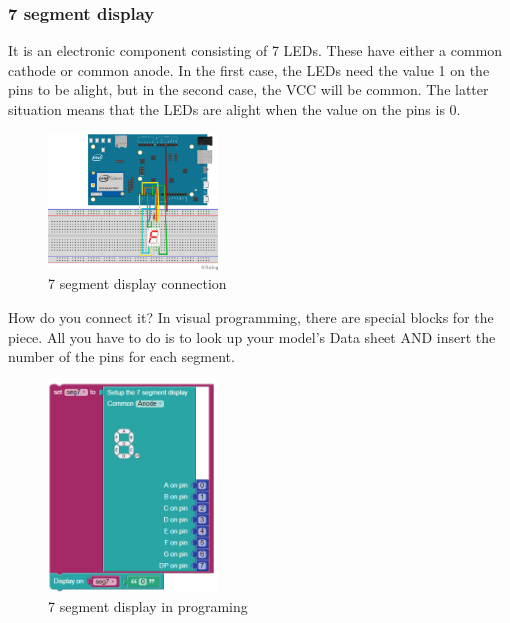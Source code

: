 \subsubsection{7 segment display}
It is an electronic component consisting of 7 LEDs. These have either a common cathode or common anode. In the first case, the LEDs need the value 1 on the pins to be alight, but in the second case, the VCC will be common. The latter situation means that the LEDs are alight when the value on the pins is 0.

\begin{figure}[ht]
    \centering
    \includegraphics[width=0.4\textwidth]{figures/7 segment display connection.png}
    \caption{7 segment display connection}
\end{figure}

How do you connect it?  In visual programming, there are special blocks for the piece. All you have to do is to look up your model's Data sheet AND insert the number of the pins for each segment.  

\begin{figure}[ht]
    \centering
    \includegraphics[width=0.4\textwidth]{figures/7 segment display in programing.png}
    \caption{7 segment display in programing}
\end{figure}

